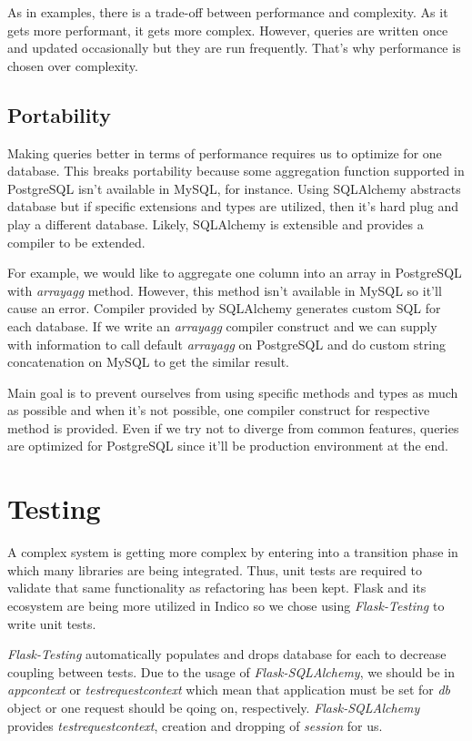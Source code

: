 As in examples, there is a trade-off between performance and complexity. As it gets more performant, it gets more complex. However, queries are written once and updated occasionally but they are run frequently. That's why performance is chosen over complexity.

\subsection{Portability}

Making queries better in terms of performance requires us to optimize for one database. This breaks portability because some aggregation function supported in PostgreSQL isn't available in MySQL, for instance. Using SQLAlchemy abstracts database but if specific extensions and types are utilized, then it's hard plug and play a different database. Likely, SQLAlchemy is extensible and provides a compiler to be extended.

For example, we would like to aggregate one column into an array in PostgreSQL with \textit{array\textunderscore agg} method. However, this method isn't available in MySQL so it'll cause an error. Compiler provided by SQLAlchemy generates custom SQL for each database. If we write an \textit{array\textunderscore agg} compiler construct and we can supply with information to call default \textit{array\textunderscore agg} on PostgreSQL and do custom string concatenation on MySQL to get the similar result.

Main goal is to prevent ourselves from using specific methods and types as much as possible and when it's not possible, one compiler construct for respective method is provided. Even if we try not to diverge from common features, queries are optimized for PostgreSQL since it'll be production environment at the end.

\section{Testing}

A complex system is getting more complex by entering into a transition phase in which many libraries are being integrated. Thus, unit tests are required to validate that same functionality as refactoring has been kept. Flask and its ecosystem are being more utilized in Indico so we chose using \textit{Flask-Testing} to write unit tests.

\textit{Flask-Testing} automatically populates and drops database for each to decrease coupling between tests. Due to the usage of \textit{Flask-SQLAlchemy}, we should be in \textit{app\textunderscore context} or \textit{test\textunderscore request\textunderscore context} which mean that application must be set for \textit{db} object or one request should be qoing on, respectively. \textit{Flask-SQLAlchemy} provides \textit{test\textunderscore request\textunderscore context}, creation and dropping of \textit{session} for us.

